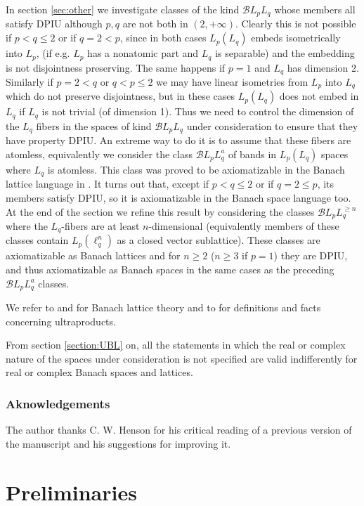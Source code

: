 \documentclass[11pt]{amsart}
\theoremstyle{plain}
\theoremstyle{remark}
\begin{document}
In section \ref{sec:other} we investigate classes of the kind $\mathcal{B}L_pL_q$ whose members all satisfy DPIU although $p,q$ are not both in $(2,+\infty)$. Clearly this is not possible if $p<q\le 2$ or if $q=2<p$, since in both cases $L_p(L_q)$ embeds isometrically into $L_p$, (if e.g. $L_p$ has a nonatomic part and $L_q$ is separable) and the embedding is not disjointness preserving. The same happens if $p=1$ and $L_q$ has dimension 2. Similarly if $p=2<q$ or $q<p\le 2$ we may have linear isometries from $L_p$ into $L_q$ which do not preserve disjointness, but in these cases $L_p(L_q)$ does not embed in $L_q$ if $L_q$ is not trivial (of dimension 1). Thus we need to control the dimension of the $L_q$ fibers in the spaces of kind  $\mathcal{B}L_pL_q$ under consideration to ensure that they have property DPIU. An extreme way to do it is to assume that these fibers are atomless, equivalently we consider the class $\mathcal{B}L_pL_q^a$ of bands in $L_p(L_q)$ spaces where $L_q$ is atomless. This class was proved to be axiomatizable in the Banach lattice language in \cite{HR-11}. It turns out that,  except if $p<q\le 2$ or if $q=2\le p$, its members satisfy DPIU, so it is axiomatizable in the Banach space language too. At the end of the section we refine this result by considering the classes $\mathcal{B}L_pL_q^{\ge n}$ where the $L_q$-fibers are at least $n$-dimensional (equivalently members of these classes contain $L_p(\ell_q^n)$ as a closed vector sublattice). These classes are   axiomatizable  as Banach  lattices and for $n\ge 2$ ($n\ge 3$ if $p=1$) they are DPIU, and thus axiomatizable  as Banach spaces in the same cases as the preceding $\mathcal{B}L_pL_q^a$ classes.  

We refer to \cite{MN} and \cite{LT} for Banach lattice theory and to \cite{H} for definitions and facts concerning ultraproducts.

From section \ref{section:UBL} on, all the statements in which the real or complex nature of the spaces under consideration is not specified are valid indifferently for real or complex Banach spaces and lattices.

\subsubsection* {Aknowledgements}The author thanks C. W. Henson for his critical reading of a previous version of the manuscript and his suggestions for improving it.

\section{Preliminaries}\label{section:Preliminaries}
\end{document}
